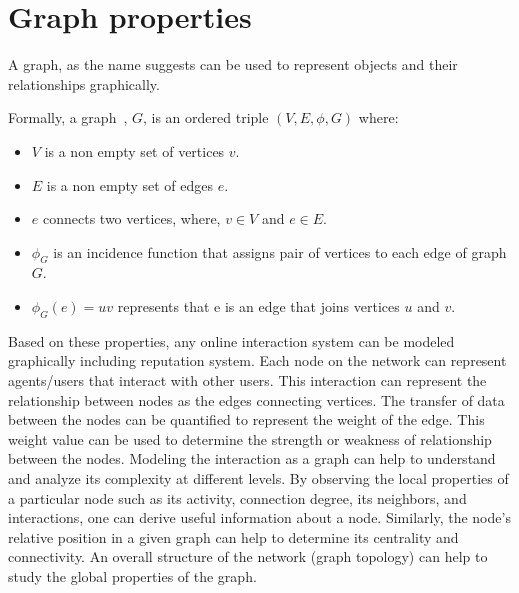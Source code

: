 \section{Graph properties}
A graph, as the name suggests can be used to represent objects and their
relationships graphically. \par
Formally, a graph~\cite{bondy1976graph}, $G$, is an ordered triple $(V,E,\phi,
G)$ where:
\begin{itemize}
	\item $V$ is a non empty set of vertices $v$.
	\item $E$ is a non empty set of edges $e$.
	\item $e$ connects two vertices, where, $v \in V$ and $e \in E$.
	\item $\phi_G$ is an incidence function that assigns pair of vertices to
		each edge of graph $G$. 
	\item $\phi_G(e) = uv$ represents that e is an edge that joins vertices $u$
		and $v$.
\end{itemize}
Based on these properties, any online interaction system can be modeled
graphically including reputation system. Each node on the network can represent
agents/users that interact with other users. This interaction can represent the
relationship between nodes as the edges connecting vertices. The transfer of
data between the nodes can be quantified to represent the weight of the edge.
This weight value can be used to determine the strength or weakness of
relationship between the nodes. Modeling the interaction as a graph can help to
understand and analyze its complexity at different levels. By observing the
local properties of a particular node such as its activity, connection degree,
its neighbors, and interactions, one can derive useful information about a
node. Similarly, the node’s relative position in a given graph can help to
determine its centrality and connectivity. An overall structure of the network
(graph topology) can help to study the global properties of the graph. \par


